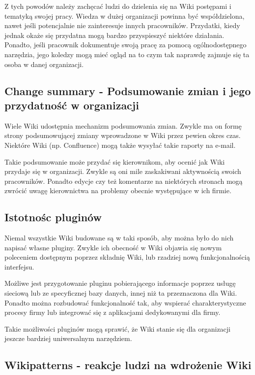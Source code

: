 \documentclass{article}
\begin{document}
	Z tych powodów należy zachęcać ludzi do dzielenia się na Wiki postępami i tematyką swojej pracy. Wiedza w dużej organizacji powinna być współdzielona, nawet jeśli potencjalnie nie zainteresuje innych pracowników. Przydatki, kiedy jednak okaże się przydatna mogą bardzo przyspieszyć niektóre działania. Ponadto, jeśli pracownik dokumentuje swoją pracę za pomocą ogólnodostępnego narzędzia, jego koledzy mogą mieć ogląd na to czym tak naprawdę zajmuje się ta osoba w danej organizacji. 

	\subsection{Change summary - Podsumowanie zmian i  jego przydatność w organizacji}
	
	Wiele Wiki udostępnia mechanizm podsumowania zmian. Zwykle ma on formę strony podsumowującej zmiany wprowadzone w Wiki przez pewien okres czas. Niektóre Wiki (np. Confluence) mogą także wysyłać takie raporty na e-mail. 

	Takie podsumowanie może przydać się kierownikom, aby ocenić jak Wiki przydaje się w organizacji. Zwykle są oni mile zaskakiwani aktywnością swoich pracowników. Ponadto edycje czy też komentarze na niektórych stronach mogą zwrócić uwagę kierownictwa na problemy obecnie występujące w ich firmie. 

	\subsection{Istotnośc pluginów}

	Niemal wszystkie Wiki budowane są w taki sposób, aby można było do nich napisać własne pluginy. Zwykle ich obecność w Wiki objawia się nowym poleceniem dostępnym poprzez składnię Wiki, lub rzadziej nową funkcjonalnością interfejsu. 

Możliwe jest przygotowanie pluginu pobierającego informacje poprzez usługę sieciową lub ze specyficznej bazy danych, innej niż ta przeznaczona dla Wiki. Ponadto można rozbudować funkcjonalność tak, aby wspierać charakterystyczne procesy firmy lub integrować się z aplikacjami dedykowanymi dla firmy. 

Takie możliwości pluginów mogą sprawić, że Wiki stanie się dla organizacji jeszcze bardziej uniwersalnym narzędziem. 

\subsection{Wikipatterns - reakcje ludzi na wdrożenie Wiki}
\end{document}

